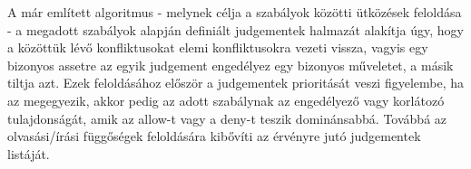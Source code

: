 A már említett algoritmus - melynek célja a szabályok közötti ütközések feloldása - a megadott szabályok alapján definiált judgementek halmazát alakítja úgy, hogy a közöttük lévő konfliktusokat elemi konfliktusokra vezeti vissza, vagyis egy bizonyos assetre az egyik judgement engedélyez egy bizonyos műveletet, a másik tiltja azt. Ezek feloldásához először a judgementek prioritását veszi figyelembe, ha az megegyezik, akkor pedig az adott szabálynak az engedélyező vagy korlátozó tulajdonságát, amik az allow-t vagy a deny-t teszik dominánsabbá. Továbbá az olvasási/írási függőségek feloldására kibővíti az érvényre jutó judgementek listáját.
